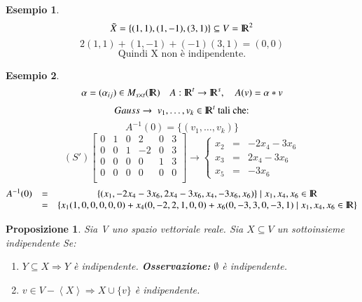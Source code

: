 \documentclass[12pt,a4paper]{article}
\theoremstyle{break}
\newtheorem{proposition}{Proposizione}[subsection]
\newtheorem{example}{Esempio}[subsection]
\newcommand\R{{\rm I\!R}}
\newcommand\CombSet[1]{\left< #1 \right>}
\begin{document}
    \begin{example}
        \[\tilde{X} = \{(1,1), (1,-1), (3,1)\}\subseteq V = \R^2\]
        \[2(1,1) + (1,-1) + (-1)(3,1) = (0,0)\]
        \[\text{Quindi X non è indipendente.}\]
    \end{example}
    \begin{example}
        \[\alpha = (\alpha_{ij})\in M_{s\times t}(\R)\quad A:\R^t\rightarrow\R^s,\quad A(v)  =\alpha*v\]
        \[Gauss \rightarrow\; v_1,\dots ,v_k\in\R^t\text{ tali che:}\]
        \[A^{-1}(0) = \{(v_1,\dots ,v_k)\}\]
        \[
            (S') 
            \left[
                \begin{matrix}
                    0 & 1 & 0 & 2 & 0 & 3 \\
                    0 & 0 & 1 & -2 & 0 & 3 \\
                    0 & 0 & 0 & 0 & 1 & 3 \\
                    0 & 0 & 0 & 0 & 0 & 0 \\
                \end{matrix}
            \right]    
            \rightarrow
            \left\{
                \begin{matrix}
                    x_2 & = & -2x_4-3x_6 \\
                    x_3 & = & 2x_4-3x_6 \\
                    x_5 & = & -3x_6
                \end{matrix}
            \right.
        \]
        \[
            \begin{matrix}
                A^{-1}(0) & = & \{(x_1,-2x_4-3x_6,2x_4-3x_6,x_4,-3x_6,x_6)\}\; |\; x_1,x_4,x_6\in\R \\
                & = & \{x_1(1,0,0,0,0,0) + x_4(0,-2,2,1,0,0) + x_6(0,-3,3,0,-3,1)\; | \; x_1,x_4,x_6\in\R\}
            \end{matrix}
        \]
    \end{example}
    \begin{proposition}
        Sia V uno spazio vettoriale reale. Sia $X\subseteq V$ un sottoinsieme indipendente Se:
        \begin{enumerate}
            \item $Y\subseteq X \Rightarrow Y$ è indipendente.
            \newline\textbf{Osservazione:} $\emptyset$ è indipendente.
            \item $v\in V-\CombSet{X} \Rightarrow X\cup \{v\}$ è indipendente.
        \end{enumerate}
    \end{proposition}
\end{document}
